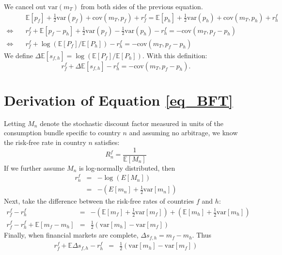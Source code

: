 We cancel out $\text{var}\left( m_T \right)$ from both sides of the previous equation.
\begin{align*}
  & \mathbb{E}\left[p_f\right]+\frac{1}{2}\text{var}\left(p_f\right) + \text{cov}\left(m_T, p_f\right) + r^f_f = \mathbb{E}\left[p_h\right]+\frac{1}{2}\text{var}\left(p_h\right)+\text{cov}\left(m_T,p_h\right) + r^f_h
  \\      \Leftrightarrow \quad
  & r^f_f+\mathbb{E}\left[p_f-p_h\right]+\frac{1}{2}\text{var}\left(p_f\right)-\frac{1}{2}\text{var}\left(p_h\right)-r^f_h = -\text{cov}\left(m_T,p_f-p_h\right)\\   
  \Leftrightarrow\quad
  &r^f_f+\log\left(\mathbb{E}\left[P_f\right]/\mathbb{E}\left[P_h\right]\right)-r^f_h = -\text{cov}\left(m_T,p_f-p_h\right)
\end{align*}
We define
$\Delta\mathbb{E}\left[s_{f,h}\right]
=\log\left(\mathbb{E}\left[P_f\right]/\mathbb{E}\left[P_h\right]\right).$
With this definition:
\begin{equation*} 
  r^f_f+\Delta\mathbb{E}\left[s_{f,h}\right]-r^f_h = -\text{cov}\left(m_T,p_f-p_h\right). 
\end{equation*}

\section{Derivation of Equation \ref{eq_BFT} \label{Appendix_BFT}}

Letting $M_n$ denote the stochastic discount factor measured in units of the consumption bundle specific to country $n$ and assuming no arbitrage, we know the risk-free rate in country $n$ satisfies:
\begin{equation*}
    R^f_n = \frac{1}{\mathbb{E} \left[ M_n\right] }
\end{equation*}
If we further assume $M_n$ is log-normally distributed, then
\begin{eqnarray*}
r^f_n &=&-\log \left( E\left[ M_n \right] \right)  \\
&=&-\left( E\left[ m_n \right] +\frac{1}{2}\text{var}\left[ m_n \right] \right) 
\end{eqnarray*}
Next, take the difference between the risk-free rates of countries $f$ and $h$:
\begin{eqnarray*}
r^f_f - r^f_h  
&=& -\left( \mathbb{E} \left[ m_f \right] +\frac{1}{2}\text{var}\left[ m_f \right] \right) 
+ \left( \mathbb{E}\left[ m_h \right] +\frac{1}{2}\text{var}\left[ m_h \right] \right)  \\
r^f_f-r^f_h + \mathbb{E} \left[ m_f - m_h \right] 
&=& \frac{1}{2}\left( \text{var}\left[ m_h \right] - \text{var}\left[ m_f \right] \right) 
\end{eqnarray*}
Finally, when financial markets are complete, $\Delta s_{f, h} = m_f - m_h$. Thus
\begin{eqnarray*}
r^f_f + \mathbb{E} \Delta s_{f, h} - r^f_h 
&=& \frac{1}{2}\left( \text{var}\left[ m_h \right] - \text{var}\left[ m_f \right] \right)
\end{eqnarray*}